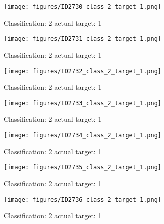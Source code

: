 \begin{figure}[h!]
\begin{center}
\texttt{[image: figures/ID2730\_class\_2\_target\_1.png]}
\end{center}
\caption{ Classification: 2 actual target: 1}
\label{fig:ID2730_class_2_target_1}
\end{figure}
\begin{figure}[h!]
\begin{center}
\texttt{[image: figures/ID2731\_class\_2\_target\_1.png]}
\end{center}
\caption{ Classification: 2 actual target: 1}
\label{fig:ID2731_class_2_target_1}
\end{figure}
\begin{figure}[h!]
\begin{center}
\texttt{[image: figures/ID2732\_class\_2\_target\_1.png]}
\end{center}
\caption{ Classification: 2 actual target: 1}
\label{fig:ID2732_class_2_target_1}
\end{figure}
\begin{figure}[h!]
\begin{center}
\texttt{[image: figures/ID2733\_class\_2\_target\_1.png]}
\end{center}
\caption{ Classification: 2 actual target: 1}
\label{fig:ID2733_class_2_target_1}
\end{figure}
\begin{figure}[h!]
\begin{center}
\texttt{[image: figures/ID2734\_class\_2\_target\_1.png]}
\end{center}
\caption{ Classification: 2 actual target: 1}
\label{fig:ID2734_class_2_target_1}
\end{figure}
\begin{figure}[h!]
\begin{center}
\texttt{[image: figures/ID2735\_class\_2\_target\_1.png]}
\end{center}
\caption{ Classification: 2 actual target: 1}
\label{fig:ID2735_class_2_target_1}
\end{figure}
\begin{figure}[h!]
\begin{center}
\texttt{[image: figures/ID2736\_class\_2\_target\_1.png]}
\end{center}
\caption{ Classification: 2 actual target: 1}
\label{fig:ID2736_class_2_target_1}
\end{figure}
